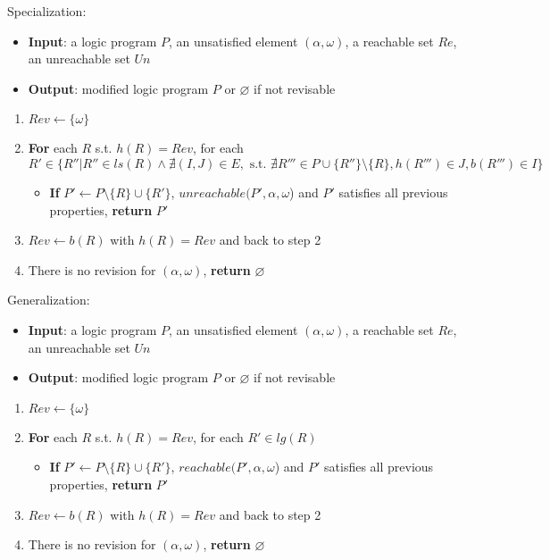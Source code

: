     \noindent
    \begin{minipage}{\linewidth}
    \vspace{1em}
    Specialization:
    \begin{itemize}
        \item \textbf{Input}: a logic program $P$, an unsatisfied element $(\alpha,\omega)$, a reachable set $Re$, an unreachable set $Un$%
        \item \textbf{Output}: modified logic program $P$ or $\varnothing$ if not revisable
    \end{itemize}
    \begin{enumerate}
        \item $Rev\gets\{\omega\}$
        \item \textbf{For} each $R$ s.t. $h(R)=Rev$, for each $R'\in\{R''|R''\in ls(R)\land \nexists (I,J)\in E, \text{ s.t. } \nexists R'''\in P\cup \{R''\}\setminus \{R\}, h(R''')\in J, b(R''')\in I\}$
        \begin{itemize}
            \item \textbf{If} $P' \gets P \setminus \{R\} \cup \{R'\}$, $unreachable(P',\alpha,\omega$) and $P'$ satisfies all previous properties, \textbf{return} $P'$
        \end{itemize}
        \item $Rev\gets b(R)$ with $h(R)=Rev$ and back to step 2
        \item There is no revision for $(\alpha,\omega)$, \textbf{return} $\varnothing$
    \end{enumerate}
    \end{minipage}
    \noindent
    \begin{minipage}{\linewidth}
    \vspace{1em}
    Generalization:
    \begin{itemize}
        \item \textbf{Input}: a logic program $P$, an unsatisfied element $(\alpha,\omega)$, a reachable set $Re$, an unreachable set $Un$
        \item \textbf{Output}: modified logic program $P$ or $\varnothing$ if not revisable
    \end{itemize}
    \begin{enumerate}
        \item $Rev\gets\{\omega\}$
        \item \textbf{For} each $R$ s.t. $h(R)=Rev$, for each $R'\in lg(R)$
        \begin{itemize}
            \item \textbf{If} $P' \gets P \setminus \{R\} \cup \{R'\}$, $reachable(P',\alpha,\omega$) and $P'$ satisfies all previous properties, \textbf{return} $P'$
        \end{itemize}
        \item $Rev\gets b(R)$ with $h(R)=Rev$ and back to step 2
        \item There is no revision for $(\alpha,\omega)$, \textbf{return} $\varnothing$
    \end{enumerate}
    \vspace{0.1em}
    \end{minipage}
